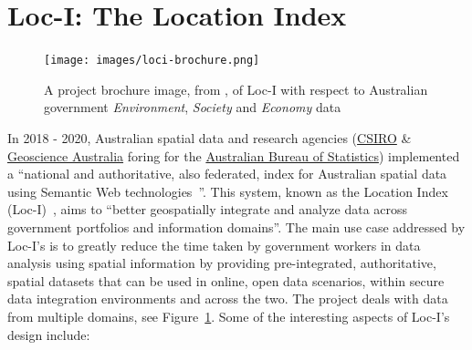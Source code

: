 \documentclass[runningheads]{llncs}
\begin{document}
\section{Loc-I: The Location Index}\label{sec:loci}

\begin{figure}[htb]
    \centering
    \texttt{[image: images/loci-brochure.png]}
    \caption{A project brochure image, from \cite{car_location_2019}, of Loc-I with respect to
    Australian government \textit{Environment}, \textit{Society} and \textit{Economy} data}
    \label{fig:loci-brochure}
\end{figure}

In 2018 - 2020, Australian spatial data and research agencies (\href{https://www.csiro.au}{CSIRO} \& \href{https://www.ga.gov.au}{Geoscience Australia} foring for the \href{https://www.abs.gov.au}{Australian Bureau of Statistics}) implemented a ``national and authoritative, also federated, index for Australian spatial data using Semantic Web technologies~\cite{car_location_2019}''.
This system, known as the Location Index (Loc-I)~\cite{car_location_2019}, aims to ``better geospatially integrate and analyze data across 
government portfolios and information domains''. The main use case addressed by Loc-I's is to greatly reduce the time taken by government 
workers in data analysis using spatial information by providing pre-integrated, authoritative, spatial datasets that can be used in 
online, open data scenarios, within secure data integration environments and across the two. The project deals with data from multiple domains,
see Figure~\ref{fig:loci-brochure}. Some of the interesting aspects of Loc-I's design include:
\end{document}
